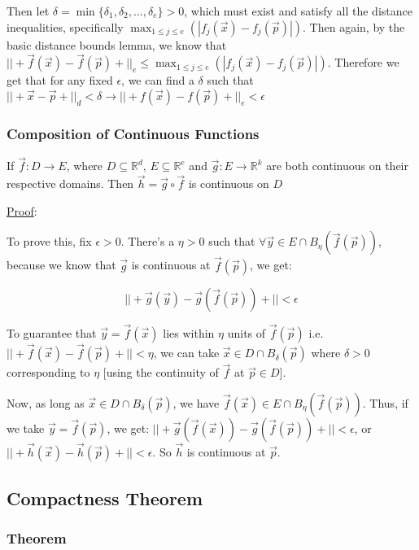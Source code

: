 \documentclass[11 pt, twoside]{article}
\begin{document}
Then let $\delta = \min\{\delta_1, \delta_2, \dots, \delta_e\} > 0$, which must
exist and satisfy all the distance inequalities, specifically $\max_{1 \leq j
\leq e}(|f_j(\vec{x}) - f_j(\vec{p})|)$. Then again, by the basic distance
bounds lemma, we know that $||+\vec{f}(\vec{x}) - \vec{f}(\vec{p})+||_e \leq \max_{1 \leq j
\leq e}(|f_j(\vec{x}) - f_j(\vec{p})|)$. Therefore we get that for any fixed
$\epsilon$, we can find a $\delta$ such that $||+\vec{x} - \vec{p}+||_d <
\delta \to ||+f(\vec{x}) - f(\vec{p})+||_e < \epsilon$

\subsubsection{Composition of Continuous Functions}
If $\vec{f}: D \to E$, where $D \subseteq \mathbb{R}^d$, $E
\subseteq \mathbb{R}^e$ and $\vec{g}: E \to \mathbb{R}^k$ are both
continuous on their respective domains. Then $\vec{h} = \vec{g} \circ \vec{f}$
is continuous on $D$

\underline{Proof}:

To prove this, fix $\epsilon > 0$. There's a $\eta > 0$ such that
$\forall \vec{y} \in E \cap B_\eta(\vec{f}(\vec{p}))$, because we know that
$\vec{g}$ is continuous at $\vec{f}(\vec{p})$, we get:

$$||+\vec{g}(\vec{y}) - \vec{g}(\vec{f}(\vec{p}))+|| < \epsilon$$

To guarantee that $\vec{y} = \vec{f}(\vec{x})$ lies within $\eta$ units of
$\vec{f}(\vec{p})$ i.e. $||+\vec{f}(\vec{x}) - \vec{f}(\vec{p})+|| < \eta$, we
can take $\vec{x} \in D \cap B_\delta(\vec{p})$ where $\delta > 0$ corresponding
to $\eta$ [using the continuity of $\vec{f}$ at $\vec{p} \in D$].

Now, as long as $\vec{x} \in D \cap B_\delta(\vec{p})$, we have
$\vec{f}(\vec{x}) \in E \cap B_\eta(\vec{f}(\vec{p}))$. Thus, if we take
$\vec{y} = \vec{f}(\vec{p})$, we get: $||+\vec{g}(\vec{f}(\vec{x})) -
\vec{g}(\vec{f}(\vec{p}))+|| < \epsilon$, or $||+\vec{h}(\vec{x}) -
\vec{h}(\vec{p})+|| < \epsilon$. So $\vec{h}$ is continuous at $\vec{p}$.

\subsection{Compactness Theorem}

\subsubsection{Theorem}
\end{document}
